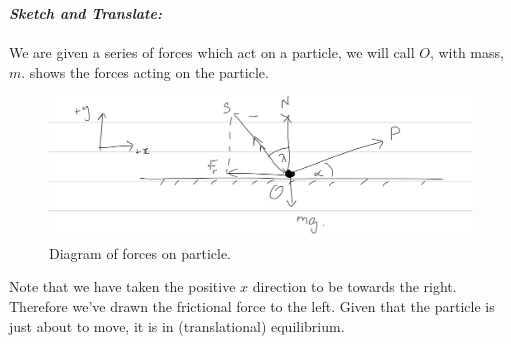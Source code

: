 \begin{subquestions}
\begin{subsubquestions}
\begin{subsubsubquestions}
\end{subsubsubquestions}

\end{subsubquestions}
	

\subquestion

\begin{subsubquestions}
	
	\subsubquestion
	
	\textbf{\textit{Sketch and Translate:}} \\ \\
	We are given a series of forces which act on a particle, we will call $O$, with mass, $m$.  shows the forces acting on the particle.
	\begin{figure} [H]
		\begin{center} 
			\includegraphics[scale=0.25]{../2014/figures/2014q55Sketch}
			\caption{\label{2014:q55:Force1} Diagram of forces on particle.}
		\end{center}
	\end{figure}
	
	Note that we have taken the positive $x$ direction to be towards the right. Therefore we've drawn the frictional force to the left. Given that the particle is just about to move, it is in (translational) equilibrium.
	
	\subsubquestion
	

\end{subsubquestions}
\end{subquestions}
